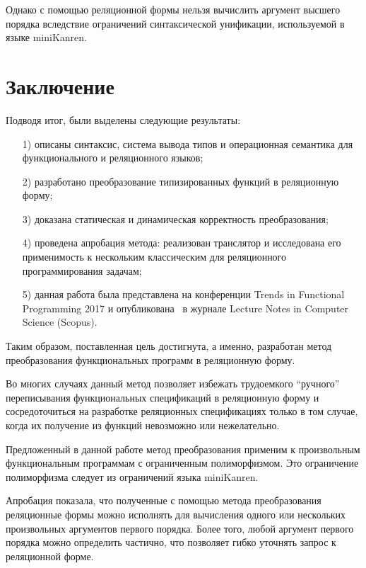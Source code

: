 Однако с помощью реляционной формы нельзя вычислить аргумент высшего порядка вследствие ограничений синтаксической унификации, используемой в языке miniKanren.

\section{Заключение}

Подводя итог, были выделены следующие результаты:
\begin{enumerate}
\item[1)] описаны синтаксис, система вывода типов и операционная семантика для функционального и реляционного языков;
\item[2)] разработано преобразование типизированных функций в реляционную форму;
\item[3)] доказана статическая и динамическая корректность преобразования;
\item[4)] проведена апробация метода: реализован транслятор и исследована его применимость к нескольким классическим для реляционного программирования задачам;
\item[5)] данная работа была представлена на конференции Trends in Functional Programming 2017 и опубликована~\cite{RelConvTFP} в журнале Lecture Notes in Computer Science (Scopus).
\end{enumerate}

Таким образом, поставленная цель достигнута, а именно, разработан метод преобразования функциональных программ в реляционную форму.

Во многих случаях данный
метод позволяет избежать трудоемкого ``ручного'' переписывания
функциональных спецификаций в реляционную форму и сосредоточиться на разработке
реляционных спецификациях только в том случае, когда их получение из функций
невозможно или нежелательно.

Предложенный в данной работе метод преобразования применим к произвольным функциональным программам
с ограниченным полиморфизмом. Это ограничение полиморфизма следует из ограничений языка miniKanren.

Апробация показала, что полученные с помощью метода преобразования
реляционные формы можно исполнять для вычисления одного или нескольких произвольных
аргументов первого порядка. Более того, любой аргумент первого порядка
можно определить частично, что позволяет гибко уточнять запрос к реляционной форме.

